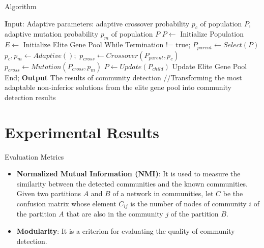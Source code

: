 \documentclass[aspectratio=169,xcolor=dvipsnames]{beamer}
\begin{document}
\begin{frame}{Algorithm}
    \begin{algorithm}[H]
        \begin{algorithmic}[1]
        \STATE \textbf Input: Adaptive parameters: adaptive crossover probability $p_{c}$ of
        population $P$, adaptive mutation probability $p_{m}$ of population $P$
        \STATE $P \leftarrow $ Initialize Population
        \STATE $E \leftarrow $ Initialize Elite Gene Pool
        \STATE While Termination != true;
        \STATE $P_{parent} \leftarrow Select(P)$
        \STATE $p_{c}, p_{m} \leftarrow Adaptive();$
        \STATE $p_{cross} \leftarrow Crossover(P_{parent}, p_{c})$
        \STATE $p_{cross} \leftarrow Mutation(P_{cross}, p_{m})$
        \STATE $P \leftarrow Update(P_{child})$
        \STATE Update Elite Gene Pool
        \STATE End;
        \STATE \textbf{Output} The results of community detection //{Transforming the most adaptable non-inferior solutions from the elite gene pool into community detection results}
        \end{algorithmic}
        \caption{Framework of F-SGCD Algorithm}
        \label{alg:seq}
    \end{algorithm}
\end{frame}


\section{Experimental Results}

\begin{frame}{Evaluation Metrics}
    \begin{itemize}
       \item \textbf{Normalized Mutual Information (NMI)}: It is used to measure the similarity between the detected communities and the known communities. Given two partitions $A$ and $B$ of a network in communities, let $C$ be the confusion matrix whose element $C_{ij}$ is the number of nodes of community $i$ of the partition $A$ that are also in the community $j$ of the partition $B$.
       \item \textbf{Modularity}: It is a criterion for evaluating the quality of community detection.
    \end{itemize}
\end{frame}
\end{document}
